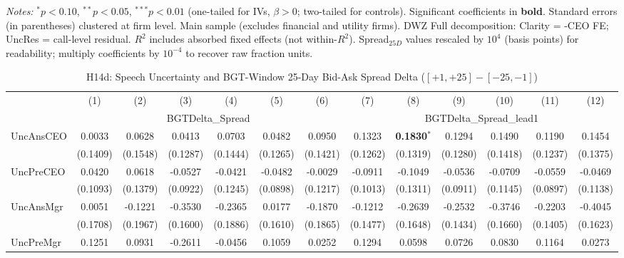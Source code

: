 \documentclass[11pt,a4paper]{article}
\begin{document}
\begin{table}[htbp]
\begin{tabular}{lcccccccccccc}
\bottomrule
\end{tabular}
\begin{minipage}{\linewidth}
\vspace{2pt}\scriptsize
\textit{Notes:} $^{*}p<0.10$, $^{**}p<0.05$, $^{***}p<0.01$ (one-tailed for IVs, $\beta > 0$; two-tailed for controls).
 Significant coefficients in \textbf{bold}.
 Standard errors (in parentheses) clustered at firm level.
 Main sample (excludes financial and utility firms). DWZ Full decomposition: Clarity = -CEO FE; UncRes = call-level residual.
 $R^2$ includes absorbed fixed effects (not within-$R^2$).
 Spread$_{25D}$ values rescaled by $10^4$ (basis points) for readability; multiply coefficients by $10^{-4}$ to recover raw fraction units.
\end{minipage}
\end{table}
\clearpage
\begin{table}[htbp]
\centering
\caption{H14d: Speech Uncertainty and BGT-Window 25-Day Bid-Ask Spread Delta ($[+1,+25]-[-25,-1]$)}
\label{tab:h14d}
\scriptsize
\begin{tabular}{lcccccccccccc}
\toprule
 & (1) & (2) & (3) & (4) & (5) & (6) & (7) & (8) & (9) & (10) & (11) & (12) \\
 & \multicolumn{6}{c}{BGTDelta\_Spread} & \multicolumn{6}{c}{BGTDelta\_Spread\_lead1} \\
\cmidrule(lr){2-7} \cmidrule(lr){8-13}
\midrule
UncAnsCEO & 0.0033 & 0.0628 & 0.0413 & 0.0703 & 0.0482 & 0.0950 & 0.1323 & \textbf{0.1830}$^{*}$ & 0.1294 & 0.1490 & 0.1190 & 0.1454 \\
 & (0.1409) & (0.1548) & (0.1287) & (0.1444) & (0.1265) & (0.1421) & (0.1262) & (0.1319) & (0.1280) & (0.1418) & (0.1237) & (0.1375) \\
UncPreCEO & 0.0420 & 0.0618 & -0.0527 & -0.0421 & -0.0482 & -0.0029 & -0.0911 & -0.1049 & -0.0536 & -0.0709 & -0.0559 & -0.0469 \\
 & (0.1093) & (0.1379) & (0.0922) & (0.1245) & (0.0898) & (0.1217) & (0.1013) & (0.1311) & (0.0911) & (0.1145) & (0.0897) & (0.1138) \\
UncAnsMgr & 0.0051 & -0.1221 & -0.3530 & -0.2365 & 0.0177 & -0.1870 & -0.1212 & -0.2639 & -0.2532 & -0.3746 & -0.2203 & -0.4045 \\
 & (0.1708) & (0.1967) & (0.1600) & (0.1886) & (0.1610) & (0.1865) & (0.1477) & (0.1648) & (0.1434) & (0.1660) & (0.1405) & (0.1623) \\
UncPreMgr & 0.1251 & 0.0931 & -0.2611 & -0.0456 & 0.1059 & 0.0252 & 0.1294 & 0.0598 & 0.0726 & 0.0830 & 0.1164 & 0.0273 \\

\end{tabular}
\end{table}
\end{document}
